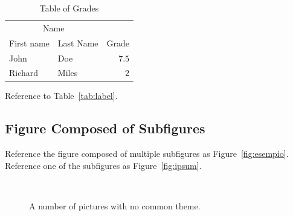 \documentclass[
10pt, %
letterpaper, %
oneside, %
headinclude,footinclude, %
BCOR5mm, %
]{article}
\begin{document}

\begin{table}[hbt]
\caption{Table of Grades}
\centering
\begin{tabular}{llr}
\toprule
\multicolumn{2}{c}{Name} \\
\cmidrule(r){1-2}
First name & Last Name & Grade \\
\midrule
John & Doe & $7.5$ \\
Richard & Miles & $2$ \\
\bottomrule
\end{tabular}
\label{tab:label}
\end{table}

Reference to Table~\vref{tab:label}. %


\subsection{Figure Composed of Subfigures}

Reference the figure composed of multiple subfigures as Figure~\vref{fig:esempio}. Reference one of the subfigures as Figure~\vref{fig:ipsum}. %


\begin{figure}[tb]
\centering
{} \quad
{} \\
 \quad
{}
\caption[A number of pictures.]{A number of pictures with no common theme.} %
\label{fig:esempio}
\end{figure}


\renewcommand{\refname}{\spacedlowsmallcaps{References}} %




\end{document}
